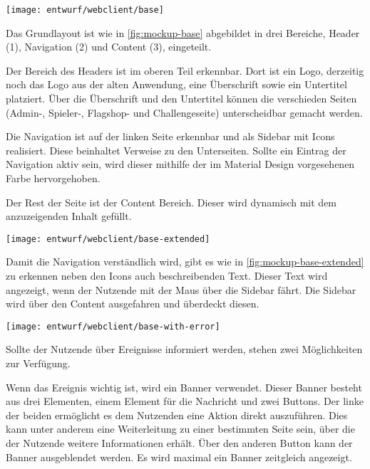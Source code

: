 \begin{center}
	\texttt{[image: entwurf/webclient/base]}
	\label{fig:mockup-base}
\end{center}

Das Grundlayout ist wie in \autoref{fig:mockup-base} abgebildet in drei Bereiche, Header (1), Navigation (2) und Content (3), eingeteilt. 

Der Bereich des Headers ist im oberen Teil erkennbar. Dort ist ein Logo, derzeitig noch das Logo aus der alten Anwendung, eine Überschrift sowie ein Untertitel platziert. Über die Überschrift und den Untertitel können die verschieden Seiten (Admin-, Spieler-, Flagshop- und Challengeseite) unterscheidbar gemacht werden.

Die Navigation ist auf der linken Seite erkennbar und als Sidebar mit Icons realisiert. Diese beinhaltet Verweise zu den Unterseiten. Sollte ein Eintrag der Navigation aktiv sein, wird dieser mithilfe der im Material Design vorgesehenen Farbe hervorgehoben.

Der Rest der Seite ist der Content Bereich. Dieser wird dynamisch mit dem anzuzeigenden Inhalt gefüllt.

\begin{center}
	\texttt{[image: entwurf/webclient/base-extended]}
	\label{fig:mockup-base-extended}
\end{center}

Damit die Navigation verständlich wird, gibt es wie in \autoref{fig:mockup-base-extended} zu erkennen neben den Icons auch beschreibenden Text. Dieser Text wird angezeigt, wenn der Nutzende mit der Maus über die Sidebar fährt. Die Sidebar wird über den Content ausgefahren und überdeckt diesen.

\begin{center}
	\texttt{[image: entwurf/webclient/base-with-error]}
	\label{fig:mockup-base-with-error}
\end{center}

Sollte der Nutzende über Ereignisse informiert werden, stehen zwei Möglichkeiten zur Verfügung.

Wenn das Ereignis wichtig ist, wird ein Banner verwendet. Dieser Banner besteht aus drei Elementen, einem Element für die Nachricht und zwei Buttons. Der linke der beiden ermöglicht es dem Nutzenden eine Aktion direkt auszuführen. Dies kann unter anderem eine Weiterleitung zu einer bestimmten Seite sein, über die der Nutzende weitere Informationen erhält. Über den anderen Button kann der Banner ausgeblendet werden. Es wird maximal ein Banner zeitgleich angezeigt.

